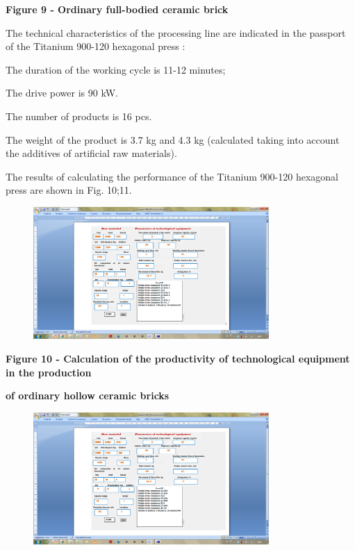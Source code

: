 {\bfseries Figure 9 - Ordinary full-bodied ceramic brick}

The technical characteristics of the processing line are indicated in
the passport of the Titanium 900-120 hexagonal press :

The duration of the working cycle is 11-12 minutes;

The drive power is 90 kW.

The number of products is 16 pcs.

The weight of the product is 3.7 kg and 4.3 kg (calculated taking into
account the additives of artificial raw materials).

The results of calculating the performance of the Titanium 900-120
hexagonal press are shown in Fig. 10;11.

\begin{figure}[H]
	\centering
	\includegraphics[width=0.8\textwidth]{assets/276}
	\caption*{}
\end{figure}

{\bfseries Figure 10 - Calculation of the productivity of technological
equipment in the production}

{\bfseries of ordinary hollow ceramic bricks}

\begin{figure}[H]
	\centering
	\includegraphics[width=0.8\textwidth]{assets/277}
	\caption*{}
\end{figure}

